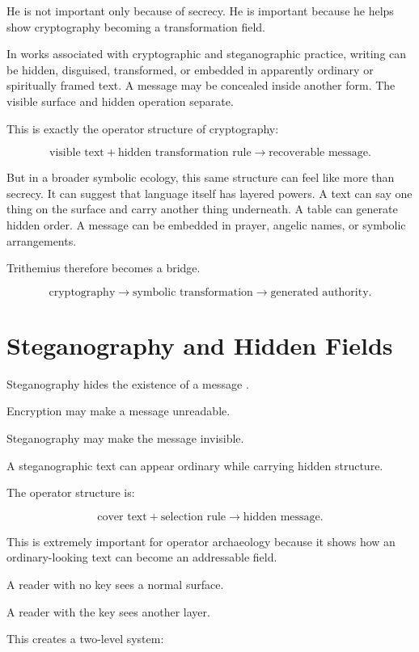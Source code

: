 \documentclass[11pt]{book}
\begin{document}
He is not important only because of secrecy. He is important because he helps show cryptography becoming a transformation field.

In works associated with cryptographic and steganographic practice, writing can be hidden, disguised, transformed, or embedded in apparently ordinary or spiritually framed text. A message may be concealed inside another form. The visible surface and hidden operation separate.

This is exactly the operator structure of cryptography:

\[
\text{visible text}
+
\text{hidden transformation rule}
\rightarrow
\text{recoverable message}.
\]

But in a broader symbolic ecology, this same structure can feel like more than secrecy. It can suggest that language itself has layered powers. A text can say one thing on the surface and carry another thing underneath. A table can generate hidden order. A message can be embedded in prayer, angelic names, or symbolic arrangements.

Trithemius therefore becomes a bridge.

\[
\text{cryptography}
\rightarrow
\text{symbolic transformation}
\rightarrow
\text{generated authority}.
\]

\section{Steganography and Hidden Fields}

Steganography hides the existence of a message \cite{Trithemius1999Steganographia,Kahn1996Codebreakers}.

Encryption may make a message unreadable.

Steganography may make the message invisible.

A steganographic text can appear ordinary while carrying hidden structure.

The operator structure is:

\[
\text{cover text}
+
\text{selection rule}
\rightarrow
\text{hidden message}.
\]

This is extremely important for operator archaeology because it shows how an ordinary-looking text can become an addressable field.

A reader with no key sees a normal surface.

A reader with the key sees another layer.

This creates a two-level system:
\end{document}
